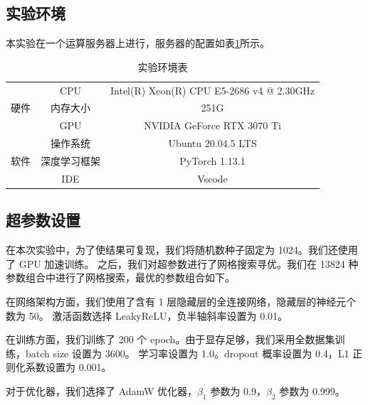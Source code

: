 \documentclass[supercite]{Experimental_Report}
\theoremstyle{definition}
\begin{document}
\subsection{实验环境}
本实验在一个运算服务器上进行，服务器的配置如表\ref{服务器配置}所示。
\begin{table}[H]
	\centering
	\caption{实验环境表}
	  \begin{tabular}{c|c|c}
		\toprule
	  \multirow{3}[0]{*}{硬件} & CPU   & Intel(R) Xeon(R) CPU E5-2686 v4 @ 2.30GHz \\
			& 内存大小    & 251G \\
			& GPU   & NVIDIA GeForce RTX 3070 Ti \\\hline
	  \multirow{3}[0]{*}{软件} & 操作系统  & Ubuntu 20.04.5 LTS \\
			& 深度学习框架 & PyTorch 1.13.1 \\
			& IDE   & Vscode \\\bottomrule
	  \end{tabular}
	\label{服务器配置}
\end{table}
\subsection{超参数设置}
在本次实验中，为了使结果可复现，我们将随机数种子固定为 1024。我们还使用了 GPU 加速训练。
之后，我们对超参数进行了网格搜索寻优。我们在 13824 种参数组合中进行了网格搜索，最优的参数组合如下。

在网络架构方面，我们使用了含有 1 层隐藏层的全连接网络，隐藏层的神经元个数为 50。
激活函数选择 LeakyReLU，负半轴斜率设置为 0.01。

在训练方面，我们训练了 200 个 epoch。由于显存足够，我们采用全数据集训练，batch size 设置为 3600。
学习率设置为 1.0。dropout 概率设置为 0.4，L1 正则化系数设置为 0.001。

对于优化器，我们选择了 AdamW 优化器，$\beta_1$ 参数为 0.9，$\beta_2$ 参数为 0.999。
\end{document}
